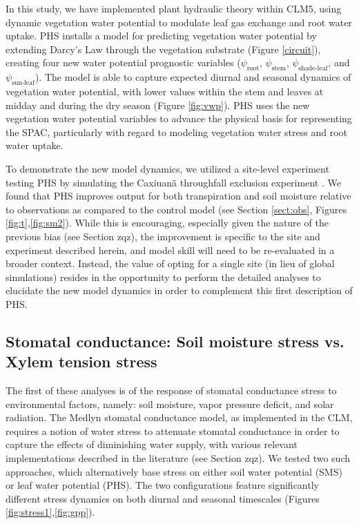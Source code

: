 \documentclass[draft,linenumbers]{agujournal}
\begin{document}
    In this study, we have implemented plant hydraulic theory within CLM5, 
    using dynamic vegetation water potential to modulate leaf gas exchange and root water uptake.
    PHS installs a model for predicting vegetation water potential by extending Darcy's Law through the vegetation substrate (Figure \ref{circuit}), 
    creating four new water potential prognostic variables ($\psi_{\text{root}}$, $\psi_{\text{stem}}$, $\psi_{\text{shade-leaf}}$, and $\psi_{\text{sun-leaf}}$).  
    The model is able to capture expected diurnal and seasonal dynamics of vegetation water potential, 
    with lower values within the stem and leaves at midday and during the dry season (Figure \ref{fig:vwp}).
    PHS uses the new vegetation water potential variables to advance the physical basis for representing the SPAC, particularly with regard to modeling vegetation water stress and root water uptake.
    
    To demonstrate the new model dynamics, we utilized a site-level experiment testing PHS by simulating the Caxiuan\~a throughfall exclusion experiment \citep{fisher2007}.
    We found that PHS improves output for both transpiration and soil moisture relative to observations as compared to the control model (see Section \ref{sect:obs}, Figures \ref{fig:t},\ref{fig:sm2}).
    While this is encouraging, especially given the nature of the previous bias (see Section zqz), the improvement is specific to the site and experiment described herein, and model skill will need to be re-evaluated in a broader context.
    Instead, the value of opting for a single site (in lieu of global simulations) resides in the opportunity to perform the detailed analyses to elucidate the new model dynamics in order to complement this first description of PHS.
    

\subsection{Stomatal conductance: Soil moisture stress vs. Xylem tension stress}
    \label{sect:stress}
    
    The first of these analyses is of the response of stomatal conductance stress to environmental factors, namely: soil moisture, vapor pressure deficit, and solar radiation.
    The Medlyn stomatal conductance model, as implemented in the CLM, requires a notion of water stress to attenuate stomatal conductance in order to capture the effects of diminishing water supply,
    with various relevant implementations described in the literature (see Section zqz).
    We tested two such approaches, which alternatively base stress on either soil water potential (SMS) or leaf water potential (PHS).
    The two configurations feature significantly different stress dynamics on both diurnal and seasonal timescales (Figures \ref{fig:stress1},\ref{fig:gpp}).     
        
\end{document}
